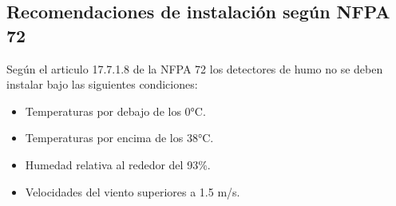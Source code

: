 %
%











\subsection{Recomendaciones de instalación según NFPA 72}


Según el articulo 17.7.1.8 de la NFPA 72 los detectores de humo no se deben instalar bajo las siguientes condiciones:


\begin{itemize}
	
	\item Temperaturas por debajo de los 0°C.
	
	\item Temperaturas por encima de los 38°C.
	
	\item Humedad relativa al rededor del 93\%.
	
	\item Velocidades del viento superiores a 1.5 m/s.
	
\end{itemize}

















